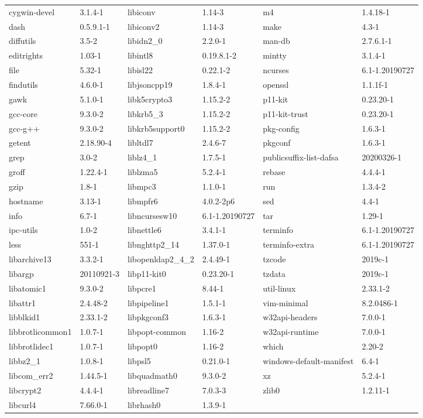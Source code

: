 \documentclass[11pt, english, openany]{report}
\begin{document}
\begin{appendices}
\begin{itemize}
\begin{table}[h]
\begin{center}
\begin{tabular}{ll|ll|ll}
			cygwin-devel & 3.1.4-1 & 	libiconv & 1.14-3 & 	m4 & 1.4.18-1 \\
			dash & 0.5.9.1-1 & 	libiconv2 & 1.14-3 & 	make & 4.3-1 \\
			diffutils & 3.5-2 & 	libidn2\_0 & 2.2.0-1 & 	man-db & 2.7.6.1-1 \\
			editrights & 1.03-1 & 	libintl8 & 0.19.8.1-2 & 	mintty & 3.1.4-1 \\
			file & 5.32-1 & 	libisl22 & 0.22.1-2 & 	ncurses & 6.1-1.20190727 \\
			findutils & 4.6.0-1 & 	libjsoncpp19 & 1.8.4-1 & 	openssl & 1.1.1f-1 \\
			gawk & 5.1.0-1 & 	libk5crypto3 & 1.15.2-2 & 	p11-kit & 0.23.20-1 \\
			gcc-core & 9.3.0-2 & 	libkrb5\_3 & 1.15.2-2 & 	p11-kit-trust & 0.23.20-1 \\
			gcc-g++ & 9.3.0-2 & 	libkrb5support0 & 1.15.2-2 & 	pkg-config & 1.6.3-1 \\
			getent & 2.18.90-4 & 	libltdl7 & 2.4.6-7 & 	pkgconf & 1.6.3-1 \\
			grep & 3.0-2 & 	liblz4\_1 & 1.7.5-1 & 	publicsuffix-list-dafsa & 20200326-1 \\
			groff & 1.22.4-1 & 	liblzma5 & 5.2.4-1 & 	rebase & 4.4.4-1 \\
			gzip & 1.8-1 & 	libmpc3 & 1.1.0-1 & 	run & 1.3.4-2 \\
			hostname & 3.13-1 & 	libmpfr6 & 4.0.2-2p6 & 	sed & 4.4-1 \\
			info & 6.7-1 & 	libncursesw10 & 6.1-1.20190727 & 	tar & 1.29-1 \\
			ipc-utils & 1.0-2 & 	libnettle6 & 3.4.1-1 & 	terminfo & 6.1-1.20190727 \\
			less & 551-1 & 	libnghttp2\_14 & 1.37.0-1 & 	terminfo-extra & 6.1-1.20190727 \\
			libarchive13 & 3.3.2-1 & 	libopenldap2\_4\_2 & 2.4.49-1 & 	tzcode & 2019c-1 \\
			libargp & 20110921-3 & 	libp11-kit0 & 0.23.20-1 & 	tzdata & 2019c-1 \\
			libatomic1 & 9.3.0-2 & 	libpcre1 & 8.44-1 & 	util-linux & 2.33.1-2 \\
			libattr1 & 2.4.48-2 & 	libpipeline1 & 1.5.1-1 & 	vim-minimal & 8.2.0486-1 \\
			libblkid1 & 2.33.1-2 & 	libpkgconf3 & 1.6.3-1 & 	w32api-headers & 7.0.0-1 \\
			libbrotlicommon1 & 1.0.7-1 & 	libpopt-common & 1.16-2 & 	w32api-runtime & 7.0.0-1 \\
			libbrotlidec1 & 1.0.7-1 & 	libpopt0 & 1.16-2 & 	which & 2.20-2 \\
			libbz2\_1 & 1.0.8-1 & 	libpsl5 & 0.21.0-1 & 	windows-default-manifest & 6.4-1 \\
			libcom\_err2 & 1.44.5-1 & 	libquadmath0 & 9.3.0-2 & 	xz & 5.2.4-1 \\
			libcrypt2 & 4.4.4-1 & 	libreadline7 & 7.0.3-3 & 	zlib0 & 1.2.11-1 \\
			libcurl4 & 7.66.0-1 & 	librhash0 & 1.3.9-1 & 	\\


\end{tabular}
\end{center}
\end{table}
\end{itemize}
\end{appendices}
\end{document}
